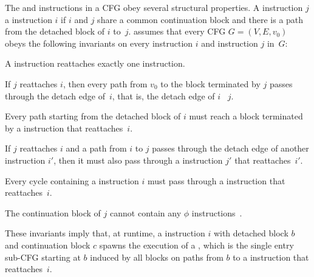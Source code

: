 The \detach and \reattach instructions in a CFG obey several
structural properties.  A \reattach instruction $j$
 a \detach instruction $i$ if $i$ and $j$ share a
common continuation block and there is a path from the detached block
of $i$ to~$j$.  \tapir assumes that every CFG $G=(V,E,v_0)$ obeys the
following invariants on every \detach instruction $i$ and \reattach
instruction $j$ in~$G$:
\begin{closeenum}

\item A \reattach instruction reattaches exactly one \detach
  instruction.

\item If $j$ reattaches $i$, then every path from $v_0$ to the block
  terminated by $j$ passes through the detach edge of~$i$, that is,
  the detach edge of $i$ ~$j$.

\item Every path starting from the detached block of $i$ must reach a
  block terminated by a \reattach instruction that reattaches~$i$.

\item If $j$ reattaches $i$ and a path from $i$ to $j$ passes through
  the detach edge of another \detach instruction $i'$, then it must
  also pass through a \reattach instruction $j'$ that reattaches~$i'$.

\item\label{const:acyclic} Every cycle containing a \detach
  instruction $i$ must pass through a \reattach instruction that
  reattaches~$i$.

\item The continuation block of $j$ cannot contain any $\phi$
  instructions~\cite[Sec~6.2.4]{AhoLaSe06}.

\end{closeenum}
These invariants imply that, at runtime, a \detach instruction $i$
with detached block $b$ and continuation block $c$ spawns the
execution of a , which is the single entry
sub-CFG starting at $b$ induced by all blocks on paths from $b$ to a
\reattach instruction that reattaches~$i$.


